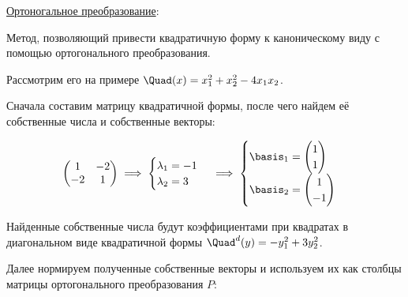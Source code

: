 \underline{Ортоногальное преобразование}:

Метод, позволяющий привести квадратичную форму к каноническому виду с
помощью ортогонального преобразования.

Рассмотрим его на примере \(\Quad(x) = x_{1}^2 + x_{2}^2 - 4 x_{1} x_{2}\).

Сначала составим матрицу квадратичной формы, после чего найдем её собственные
числа и собственные векторы:

\begin{align*}
  \begin{pmatrix}
     1 & -2 \\
    -2 & 1
  \end{pmatrix}
  \implies
  \begin{cases}
    \lambda_{1} = -1 \\
    \lambda_{2} = 3
  \end{cases}
  \implies
  \begin{cases}
    \basis_{1} = \begin{pmatrix} 1 \\ 1 \end{pmatrix} \\
    \basis_{2} = \begin{pmatrix} 1 \\ -1 \end{pmatrix}
  \end{cases}
\end{align*}

Найденные собственные числа будут коэффициентами при квадратах в диагональном
виде квадратичной формы \(\Quad^{d}(y) = -y_{1}^2 + 3 y_{2}^2\).

Далее нормируем полученные собственные векторы и используем их как столбцы
матрицы ортогонального преобразования \(P\):

